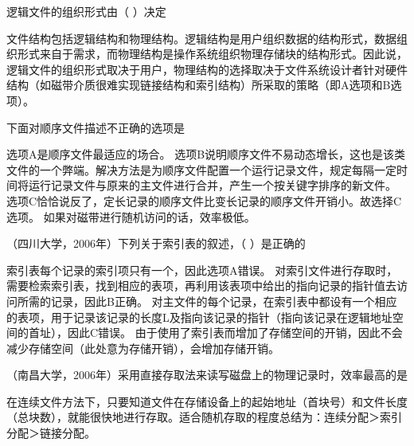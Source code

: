 \question 逻辑文件的组织形式由（ ）决定
\par{}
\begin{solution}文件结构包括逻辑结构和物理结构。逻辑结构是用户组织数据的结构形式，数据组织形式来自于需求，而物理结构是操作系统组织物理存储块的结构形式。因此说，逻辑文件的组织形式取决于用户，物理结构的选择取决于文件系统设计者针对硬件结构（如磁带介质很难实现链接结构和索引结构）所采取的策略（即A选项和B选项）。
\end{solution}
\question 下面对顺序文件描述不正确的选项是
\par{}
\begin{solution}选项A是顺序文件最适应的场合。
选项B说明顺序文件不易动态增长，这也是该类文件的一个弊端。解决方法是为顺序文件配置一个运行记录文件，规定每隔一定时间将运行记录文件与原来的主文件进行合并，产生一个按关键字排序的新文件。
选项C恰恰说反了，定长记录的顺序文件比变长记录的顺序文件开销小。故选择C选项。
如果对磁带进行随机访问的话，效率极低。
\end{solution}
\question （四川大学，2006年）下列关于索引表的叙述，（ ）是正确的
\par{}
\begin{solution}索引表每个记录的索引项只有一个，因此选项A错误。
对索引文件进行存取时，需要检索索引表，找到相应的表项，再利用该表项中给出的指向记录的指针值去访问所需的记录，因此B正确。
对主文件的每个记录，在索引表中都设有一个相应的表项，用于记录该记录的长度L及指向该记录的指针（指向该记录在逻辑地址空间的首址），因此C错误。
由于使用了索引表而增加了存储空间的开销，因此不会减少存储空间（此处意为存储开销），会增加存储开销。
\end{solution}
\question （南昌大学，2006年）采用直接存取法来读写磁盘上的物理记录时，效率最高的是
\par{}
\begin{solution}在连续文件方法下，只要知道文件在存储设备上的起始地址（首块号）和文件长度（总块数），就能很快地进行存取。适合随机存取的程度总结为：连续分配＞索引分配＞链接分配。
\end{solution}
